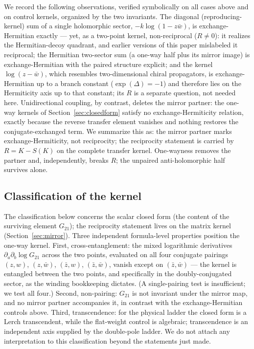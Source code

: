 \documentclass[11pt,a4paper]{article}
\newcommand{\zb}{\bar{z}}
\newcommand{\wb}{\bar{w}}
\begin{document}
We record the following observations, verified symbolically on all cases above
and on control kernels, organized by the two invariants. The diagonal
(reproducing-kernel) sum of a single holomorphic sector, $-k \log(1 - z\wb)$,
is exchange-Hermitian exactly --- yet, as a two-point kernel, non-reciprocal
($R \neq 0$): it realizes the Hermitian-decoy quadrant, and earlier versions
of this paper mislabeled it reciprocal; the Hermitian two-sector sum
(a one-way half plus its mirror image) is exchange-Hermitian with the paired
structure explicit; and the kernel $\log(z - \wb)$, which resembles
two-dimensional chiral propagators, is exchange-Hermitian up to a branch
constant ($\exp(\Delta) = -1$) and therefore lies on the Hermiticity axis up
to that constant; its $R$ is a separate question, not needed here.
Unidirectional coupling, by contrast, deletes the mirror partner: the one-way
kernels of Section~\ref{sec:closedform} satisfy no exchange-Hermiticity
relation, exactly because the reverse transfer element vanishes and nothing
restores the conjugate-exchanged term. We summarize this as: the mirror
partner marks exchange-Hermiticity, not reciprocity; the reciprocity statement
is carried by $R = K - S(K)$ on the complete transfer kernel. One-wayness
removes the partner and, independently, breaks $R$; the unpaired
anti-holomorphic half survives alone.

\subsection{Classification of the kernel}

The classification below concerns the scalar closed form (the content of the
surviving element $G_{21}$); the reciprocity statement lives on the matrix
kernel (Section~\ref{sec:mirror}). Three independent formula-level
properties position the one-way kernel. First,
cross-entanglement: the mixed logarithmic derivatives
$\partial_a \partial_b \log G_{21}$ across the two points, evaluated on all four
conjugate pairings $(z,w)$, $(z,\wb)$, $(\zb,w)$, $(\zb,\wb)$, vanish except on
$(\zb, \wb)$ --- the kernel is entangled between the two points, and
specifically in the doubly-conjugated sector, as the winding bookkeeping
dictates. (A single-pairing test is insufficient; we test all four.) Second,
non-pairing: $G_{21}$ is not invariant under the mirror map, and no mirror partner
accompanies it, in contrast with the exchange-Hermitian controls above. Third,
transcendence: for the physical ladder the closed form is a Lerch transcendent,
while the flat-weight control is algebraic; transcendence is an independent
axis supplied by the double-pole ladder. We do not attach any interpretation to
this classification beyond the statements just made.
\end{document}
